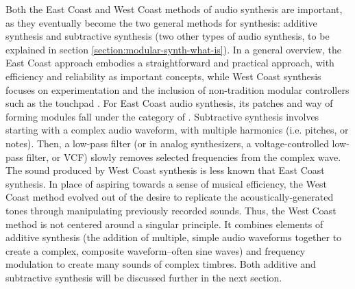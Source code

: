 Both the East Coast and West Coast methods of audio synthesis are important, as they eventually become the two general methods for synthesis: additive synthesis and subtractive synthesis (two other types of audio synthesis, to be explained in section \ref{section:modular-synth-what-is}). In a general overview, the East Coast approach embodies a straightforward and practical approach, with efficiency and reliability as important concepts, while West Coast synthesis focuses on experimentation and the inclusion of non-tradition modular controllers such as the touchpad \cite{Meyer_2016}. For East Coast audio synthesis, its patches and way of forming modules fall under the category of . Subtractive synthesis involves starting with a complex audio waveform, with multiple harmonics (i.e. pitches, or notes)\cite{Winer_2018}. Then, a low-pass filter (or in analog synthesizers, a voltage-controlled low-pass filter, or VCF) slowly removes selected frequencies from the complex wave. The sound produced by West Coast synthesis is less known that East Coast synthesis. In place of aspiring towards a sense of musical efficiency, the West Coast method evolved out of the desire to replicate the acoustically-generated tones through manipulating previously recorded sounds\cite{Nielsen}. Thus, the West Coast method is not centered around a singular principle. It combines elements of additive synthesis (the addition of multiple, simple audio waveforms together to create a complex, composite waveform--often sine waves)\cite{Nielsen} and frequency modulation to create many sounds of complex timbres. Both additive and subtractive synthesis will be discussed further in the next section.
